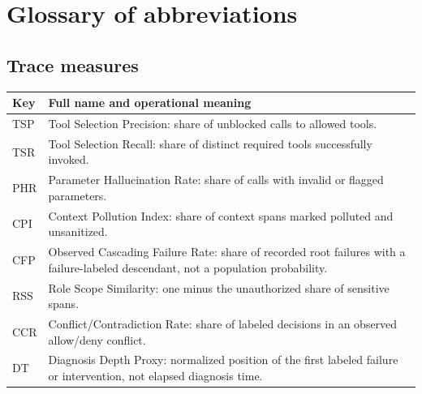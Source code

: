 \appendix
\clearpage
\section{Glossary of abbreviations}
\label{app:glossary}

\subsection*{Trace measures}
\begin{tabular}{@{}p{.42in}p{2.55in}@{}}
\toprule
Key & Full name and operational meaning \\
\midrule
TSP & Tool Selection Precision: share of unblocked calls to allowed tools. \\
TSR & Tool Selection Recall: share of distinct required tools successfully invoked. \\
PHR & Parameter Hallucination Rate: share of calls with invalid or flagged parameters. \\
CPI & Context Pollution Index: share of context spans marked polluted and unsanitized. \\
CFP & Observed Cascading Failure Rate: share of recorded root failures with a failure-labeled descendant, not a population probability. \\
RSS & Role Scope Similarity: one minus the unauthorized share of sensitive spans. \\
CCR & Conflict/Contradiction Rate: share of labeled decisions in an observed allow/deny conflict. \\
DT & Diagnosis Depth Proxy: normalized position of the first labeled failure or intervention, not elapsed diagnosis time. \\
\bottomrule
\end{tabular}

\newpage

